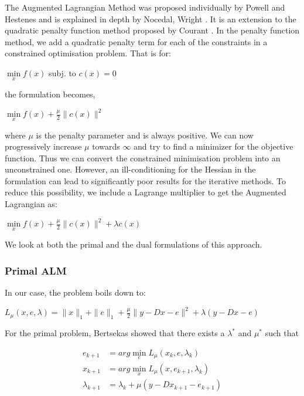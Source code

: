 \documentclass{article} %
\begin{document}
The Augmented Lagrangian Method was proposed individually by Powell \citep{powell1964efficient} and Hestenes \citep{hestenes1969multiplier} and is explained in depth by Nocedal, Wright \citep{wright1999numerical}. It is an extension to the quadratic penalty function method proposed by Courant \citep{courant1943variational}. In the penalty function method, we add a quadratic penalty term for each of the constraints in a constrained optimisation problem. That is for:
\begin{center}
$\min\limits_x f(x)$ subj. to $c(x) = 0$
\end{center}
the formulation becomes,
\begin{center}
$\min\limits_x f(x) + \frac{\mu}{2}\|c(x)\|^2$
\end{center}
where $\mu$ is the penalty parameter and is always positive. We can now progressively increase $\mu$ towards $\infty$ and try to find a minimizer for the objective function.
Thus we can convert the constrained minimisation problem into an unconstrained one. However, an ill-conditioning for the Hessian in the formulation can lead to significantly poor results for the iterative methods. To reduce this possibility, we include a Lagrange multiplier to get the Augmented Lagrangian as:
\begin{center}
$\min\limits_x f(x) + \frac{\mu}{2}\|c(x)\|^2 + \lambda c(x)$
\end{center}

We look at both the primal and the dual formulations of this approach.

\vspace{-.2cm}
\subsubsection{Primal ALM}
\vspace{-.2cm}
In our case, the problem boils down to:
\begin{center}
$L_{\mu}(x,e,\lambda) = \|x\|_1 + \|e\|_1 + \frac{\mu}{2}\|y - Dx - e\|^2 + \lambda (y - Dx - e)$
\end{center}

For the primal problem, Bertsekas \citep{bertsekasnonlinear} showed that there exists a $\lambda^{*}$ and $\mu^{*}$ such that
\begin{center}
\begin{align*}
e_{k+1} &= arg \min_e L_{\mu}(x_k,e,\lambda_k)\\
x_{k+1} &= arg \min_x L_{\mu}(x,e_{k+1},\lambda_k)\\
\lambda_{k+1} &= \lambda_k + \mu(y - Dx_{k+1} - e_{k+1})
\end{align*}
\end{center}
\end{document}

